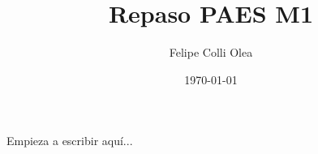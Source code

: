 \documentclass[11pt]{article}
\title{Repaso PAES M1}
\author{Felipe Colli Olea}
\date{\today}
\begin{document}
\maketitle
\thispagestyle{fancy} %

Empieza a escribir aquí...
\end{document}
